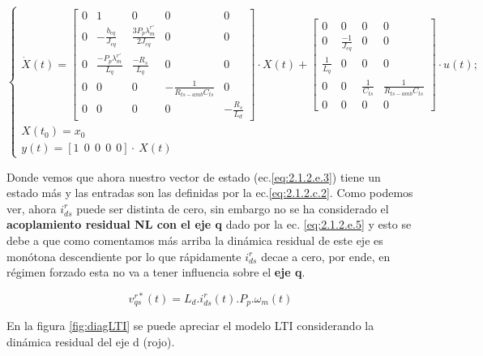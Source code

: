 \documentclass[10pt]{article}
\begin{document}
\begin{enumerate}
\begin{itemize}
	\begin{equation}
	\begin{cases}
	\dot{X}(t)=\begin{bmatrix}
	0 & 1 &0 &0&0\\ 
	0 & -\frac{b_{eq}}{J_{eq}} & \frac{3 P_{p} \lambda^{r'}_{m}}{2 J_{eq}} & 0&0\\ 
	0  & \frac{- P_{p} \lambda^{r'}_{m}}{ L_{q}} & \frac{-R_{s}}{L_{q}} & 0&0\\
	0 & 0 & 0 & -\frac{1}{R_{ts-amb} C_{ts}}&0\\
	0&0&0&0&-\frac{R_{s}}{L_{d}}
	\end{bmatrix}\cdot X(t) + \begin{bmatrix}
	0 &0 &0 &0\\ 
	0 &\frac{-1}{J_{eq}} &0 &0\\ 
	 \frac{1}{L_{q}}&0 &0 & 0\\
	0 & 0 & \frac{1}{C_{ts}} & \frac{1}{R_{ts-amb} C_{ts}}\\
	0 &0 &0 &0
	\end{bmatrix} 
	\cdot u(t); \\
	X(t_{0})=x_{0}\\ 
	y(t)=[1 \ \ 0 \ \ 0 \ \ 0 \ \ 0]\cdot \ X(t)
	\end{cases}
	\label{eq:2.1.2.e.4}
	\end{equation}
	

	

	Donde vemos que ahora nuestro vector de estado (ec.\ref{eq:2.1.2.e.3}) tiene un estado más y las entradas son las definidas por la ec.\ref{eq:2.1.2.c.2}. Como podemos ver, ahora $i^{r}_{ds}$ puede ser distinta de cero, sin embargo no se ha considerado el \textbf{acoplamiento residual NL con el eje q} dado por la ec. \ref{eq:2.1.2.e.5} y esto se debe a que como comentamos más arriba la dinámica residual de este eje es monótona descendiente por lo que rápidamente $i^{r}_{ds}$ decae a cero, por ende, en régimen forzado esta no va a tener influencia sobre el \textbf{eje q}.
	
	\begin{equation}
	v^{r*}_{qs}(t)=L_{d}. i^{r}_{ds}(t).P_{p}.\omega_{m}(t)
	\label{eq:2.1.2.e.5}
	\end{equation}
	
	En la figura \ref{fig:diagLTI} se puede apreciar el modelo LTI considerando la dinámica residual del eje d (rojo).
	

\end{itemize}
\end{enumerate}
\end{document}
